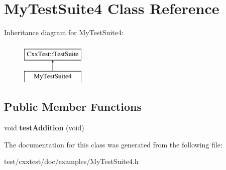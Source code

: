 \hypertarget{classMyTestSuite4}{\section{My\-Test\-Suite4 Class Reference}
\label{classMyTestSuite4}
}
Inheritance diagram for My\-Test\-Suite4\-:\begin{figure}[H]
\begin{center}
\leavevmode
\includegraphics[height=2.000000cm]{classMyTestSuite4}
\end{center}
\end{figure}
\subsection*{Public Member Functions}
\begin{DoxyCompactItemize}
\item 
\hypertarget{classMyTestSuite4_ac475d2dc5e5b3f6645564defb0bfd42b}{void {\bfseries test\-Addition} (void)}\label{classMyTestSuite4_ac475d2dc5e5b3f6645564defb0bfd42b}

\end{DoxyCompactItemize}


The documentation for this class was generated from the following file\-:\begin{DoxyCompactItemize}
\item 
test/cxxtest/doc/examples/My\-Test\-Suite4.\-h\end{DoxyCompactItemize}
